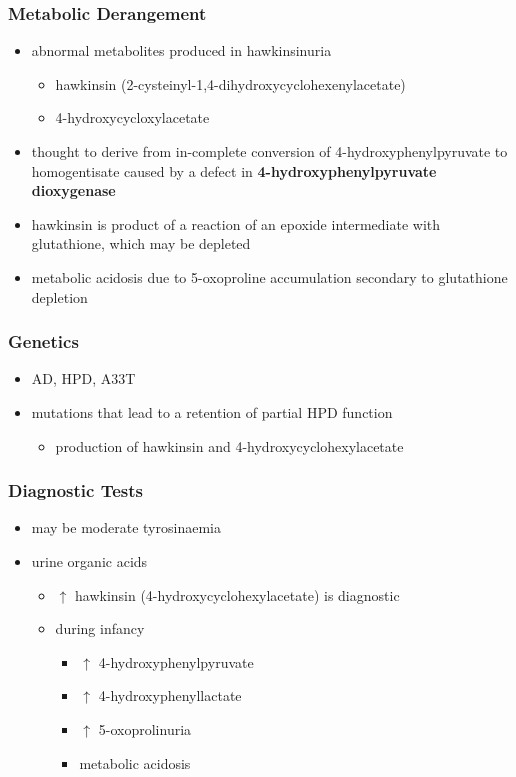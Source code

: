 \documentclass{scrartcl}
\begin{document}
\subsubsection{Metabolic Derangement}
\label{sec:orgf4c3666}
\begin{itemize}
\item abnormal metabolites produced in hawkinsinuria
\begin{itemize}
\item hawkinsin (2-cysteinyl-1,4-dihydroxycyclohexenylacetate)
\item 4-hydroxycycloxylacetate
\end{itemize}
\item thought to derive from in-complete conversion of
4-hydroxyphenylpyruvate to homogentisate caused by a defect in
\textbf{4-hydroxyphenylpyruvate dioxygenase}
\end{itemize}
\begin{itemize}
\item hawkinsin is product of a reaction of an epoxide intermediate with
glutathione, which may be depleted
\item metabolic acidosis due to 5-oxoproline accumulation secondary to
glutathione depletion
\end{itemize}

\subsubsection{Genetics}
\label{sec:orgb14a566}
\begin{itemize}
\item AD, HPD, A33T
\item mutations that lead to a retention of partial HPD function
\begin{itemize}
\item production of hawkinsin and 4-hydroxycyclohexylacetate
\end{itemize}
\end{itemize}
\subsubsection{Diagnostic Tests}
\label{sec:org2a52897}
\begin{itemize}
\item may be moderate tyrosinaemia
\item urine organic acids
\begin{itemize}
\item \(\uparrow\) hawkinsin (4-hydroxycyclohexylacetate) is diagnostic
\item during infancy
\begin{itemize}
\item \(\uparrow\) 4-hydroxyphenylpyruvate
\item \(\uparrow\) 4-hydroxyphenyllactate
\item \(\uparrow\) 5-oxoprolinuria
\item metabolic acidosis
\end{itemize}
\end{itemize}
\end{itemize}
\end{document}
